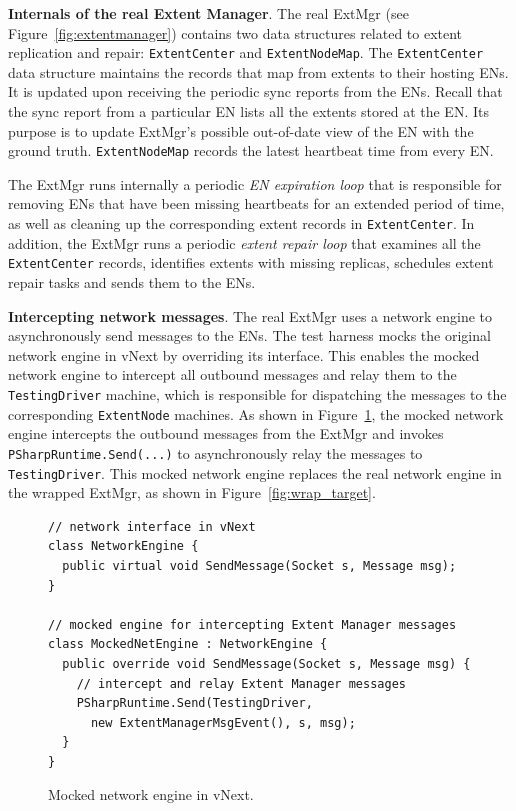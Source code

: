 \textbf{Internals of the real Extent Manager}.
The real ExtMgr (see Figure~\ref{fig:extentmanager}) contains two data structures related to extent replication and repair: \texttt{ExtentCenter} and \texttt{ExtentNodeMap}. The \texttt{ExtentCenter} data structure maintains the records that map from extents to their hosting ENs. It is updated upon receiving the periodic sync reports from the ENs. Recall that the sync report from a particular EN lists all the extents stored at the EN. Its purpose is to update ExtMgr's possible out-of-date view of the EN with the ground truth. \texttt{ExtentNodeMap} records the latest heartbeat time from every EN.

The ExtMgr runs internally a periodic \emph{EN expiration loop} that is responsible for removing ENs that have been missing heartbeats for an extended period of time, as well as cleaning up the corresponding extent records in \texttt{ExtentCenter}. In addition, the ExtMgr runs a periodic \emph{extent repair loop} that examines all the \texttt{ExtentCenter} records, identifies extents with missing replicas, schedules extent repair tasks and sends them to the ENs.

\textbf{Intercepting network messages}.
The real ExtMgr uses a network engine to asynchronously send messages to the ENs. The \psharp test harness mocks the original network engine in vNext by overriding its interface. This enables the mocked network engine to intercept all outbound messages and relay them to the \texttt{TestingDriver} machine, which is responsible for dispatching the messages to the corresponding \texttt{ExtentNode} machines. As shown in Figure~\ref{fig:enginecode}, the mocked network engine intercepts the outbound messages from the ExtMgr and invokes \texttt{PSharpRuntime.Send(...)} to asynchronously relay the messages to \texttt{TestingDriver}. This mocked network engine replaces the real network engine in the wrapped ExtMgr, as shown in Figure~\ref{fig:wrap_target}.

\begin{figure}[t]
\begin{lstlisting}
// network interface in vNext
class NetworkEngine {
  public virtual void SendMessage(Socket s, Message msg);
}

// mocked engine for intercepting Extent Manager messages
class MockedNetEngine : NetworkEngine {
  public override void SendMessage(Socket s, Message msg) {
    // intercept and relay Extent Manager messages
    PSharpRuntime.Send(TestingDriver,
      new ExtentManagerMsgEvent(), s, msg);
  }
}
\end{lstlisting}
\vspace{-3mm}
\caption{Mocked network engine in vNext.}
\label{fig:enginecode}
\vspace{-2mm}
\end{figure}

